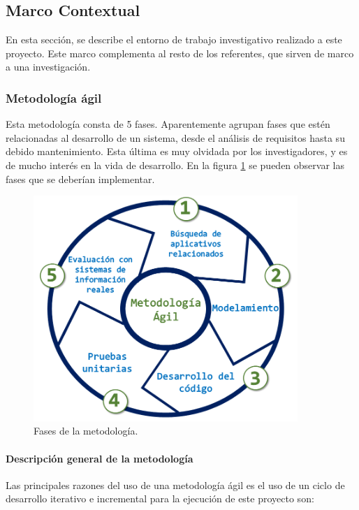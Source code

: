 \documentclass[12pt,a4paper,final, xcolor=table, table]{article}
\begin{document}
	\subsection{Marco Contextual}
	
	En esta sección, se describe el entorno de trabajo investigativo realizado a este proyecto. Este marco complementa al resto de los referentes, que sirven de marco a una investigación.
		
	\subsubsection{Metodología ágil}
	
	Esta metodología consta de 5 fases. Aparentemente agrupan fases que estén relacionadas al desarrollo de un sistema, desde el análisis de requisitos hasta su debido mantenimiento. Esta última es muy olvidada por los investigadores, y es de mucho interés en la vida de desarrollo. En la figura \ref{fig:metod} se pueden observar las fases que se deberían implementar.
	
	\begin{figure}[h!]
		\centering
		\includegraphics[width=10cm]{images/metodologia.png}
		\caption{Fases de la metodología.}
		\label{fig:metod}
	\end{figure}
	
	\paragraph{Descripción general de la metodología}
	Las principales razones del uso de una metodología ágil es el uso de un ciclo de desarrollo iterativo e incremental para la ejecución de este proyecto son:
	
\end{document}
